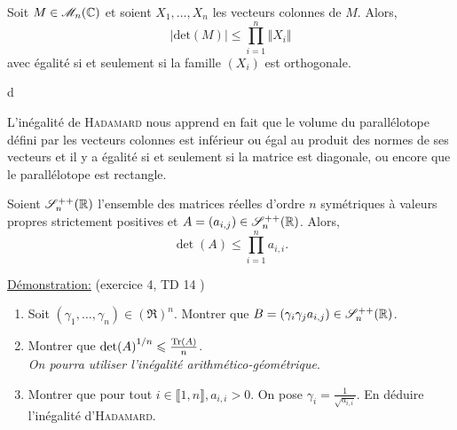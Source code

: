 
\begin{prop}
    Soit $M \in \mathscr{M}_n(\mathbb{C})$ et soient $X_1, \dots, X_n$ les vecteurs colonnes de $M$. Alors,
    $$|\mathrm{det}(M)| \leqslant \prod_{i=1}^{n} \Vert X_i \Vert$$
    avec égalité si et seulement si la famille $(X_i)$ est orthogonale.
\end{prop}

\begin{marginfigure}[0.8cm]
    
\end{marginfigure}


\begin{preuve_titre}
    d
\end{preuve_titre}

\begin{remarque}
    L'inégalité de \textsc{Hadamard} nous apprend en fait que le volume du parallélotope défini par les vecteurs colonnes est inférieur ou égal au produit des normes de ses vecteurs et il y a égalité si et seulement si la matrice est diagonale, ou encore que le parallélotope est rectangle. 
\end{remarque}

\begin{prop}
    Soient $\mathscr{S}_n ^{++} (\mathbb{R})$ l'ensemble des matrices réelles d'ordre $n$ symétriques à valeurs propres strictement positives et $A = (a_{i,j}) \in \mathscr{S}_n ^{++} (\mathbb{R})$. Alors,
    $$\det(A) \leqslant \prod_{i=1}^{n} a_{i,i}.$$
\end{prop}

\underline{Démonstration:} (exercice 4, TD 14 \cite{acamanes})

\begin{enumerate}
    \item Soit $(\gamma_1, \dots, \gamma_n) \in (\Re)^n$. Montrer que $B = (\gamma_i \gamma_j a_{i,j}) \in \mathscr{S}_n^{++}(\mathbb{R})$. 
    \item Montrer que $\det(A)^{1/n} \leqslant \frac{\mathrm{Tr}(A)}{n}$. \\
    \emph{On pourra utiliser l'inégalité arithmético-géométrique}.
    
    
    \item Montrer que pour tout $i \in \llbracket 1, n \rrbracket, a_{i,i} > 0$. On pose $\gamma_i = \frac{1}{\sqrt{a_{i,i}}}$. En déduire l'inégalité d'\textsc{Hadamard}.
\end{enumerate}